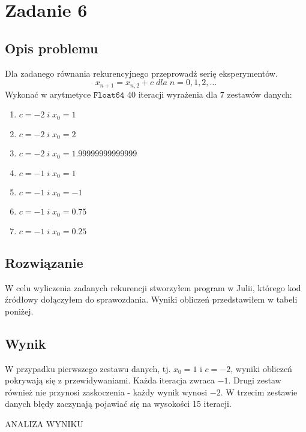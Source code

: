 \section{Zadanie 6}
\subsection{Opis problemu}
Dla zadanego równania rekurencyjnego przeprowadź serię eksperymentów.
$$ x_{n+1} = x_{n,2} + c\; dla\; n = 0, 1, 2,\ldots$$
Wykonać w arytmetyce $ \mathtt{Float64} $ 40 iteracji wyrażenia dla 7 zestawów danych:
\begin{enumerate}
  \item $ c = -2 \;i\; x_0 = 1 $
  \item $ c = -2 \;i\; x_0 = 2 $
  \item $ c = -2 \;i\; x_0 = 1.99999999999999 $
  \item $ c = -1 \;i\; x_0 = 1 $
  \item $ c = -1 \;i\; x_0 = -1 $
  \item $ c = -1 \;i\; x_0 = 0.75 $
  \item $ c = -1 \;i\; x_0 = 0.25 $
\end{enumerate}
\subsection{Rozwiązanie}
W celu wyliczenia zadanych rekurencji stworzyłem program w Julii, którego kod źródłowy dołączyłem do sprawozdania. Wyniki obliczeń przedstawiłem w tabeli poniżej.
\subsection{Wynik}
\begin{center}
    
\end{center}

W przypadku pierwszego zestawu danych, tj. $ x_0 = 1 $ i $c = -2 $, wyniki obliczeń pokrywają się z przewidywaniami. Każda iteracja zwraca $ -1 $. Drugi zestaw również nie przynosi zaskoczenia - każdy wynik wynosi $ -2 $. W trzecim zestawie danych błędy zaczynają pojawiać się na wysokości 15 iteracji.

ANALIZA WYNIKU